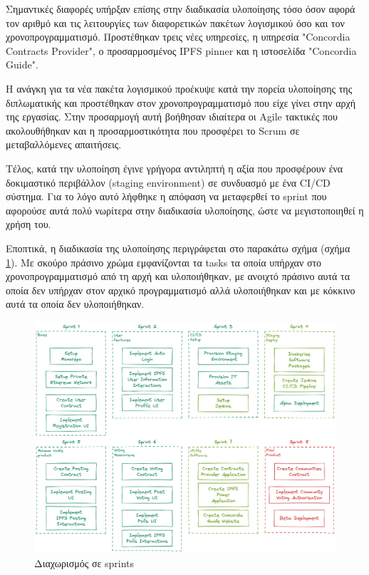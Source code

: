 Σημαντικές διαφορές υπήρξαν επίσης στην διαδικασία υλοποίησης τόσο όσον αφορά τον αριθμό και τις λειτουργίες των διαφορετικών πακέτων λογισμικού όσο και τον χρονοπρογραμματισμό. Προστέθηκαν τρεις νέες υπηρεσίες, η υπηρεσία "Concordia Contracts Provider", ο προσαρμοσμένος IPFS pinner και η ιστοσελίδα "Concordia Guide".

Η ανάγκη για τα νέα πακέτα λογισμικού προέκυψε κατά την πορεία υλοποίησης της διπλωματικής και προστέθηκαν στον χρονοπρογραμματισμό που είχε γίνει στην αρχή της εργασίας. Στην προσαρμογή αυτή βοήθησαν ιδιαίτερα οι Agile τακτικές που ακολουθήθηκαν και η προσαρμοστικότητα που προσφέρει το Scrum σε μεταβαλλόμενες απαιτήσεις.

Τέλος, κατά την υλοποίηση έγινε γρήγορα αντιληπτή η αξία που προσφέρουν ένα δοκιμαστικό περιβάλλον (staging environment) σε συνδυασμό με ένα CI/CD σύστημα. Για το λόγο αυτό λήφθηκε η απόφαση να μεταφερθεί το sprint που αφορούσε αυτά πολύ νωρίτερα στην διαδικασία υλοποίησης, ώστε να μεγιστοποιηθεί η χρήση του.

Εποπτικά, η διαδικασία της υλοποίησης περιγράφεται στο παρακάτω σχήμα (σχήμα \ref{figure:4.6.design-implementation-differences-sprints}). Με σκούρο πράσινο χρώμα εμφανίζονται τα tasks τα οποία υπήρχαν στο χρονοπρογραμματισμό από τη αρχή και υλοποιήθηκαν, με ανοιχτό πράσινο αυτά τα οποία δεν υπήρχαν στον αρχικό προγραμματισμό αλλά υλοποιήθηκαν και με κόκκινο αυτά τα οποία δεν υλοποιήθηκαν.

\begin{figure}[H]
    \centering
    \includegraphics[width=\textwidth]{assets/figures/chapter-4/4.6.design-implementation-differences-sprints.png}
    \caption{Διαχωρισμός σε sprints}
    \label{figure:4.6.design-implementation-differences-sprints}
\end{figure}
